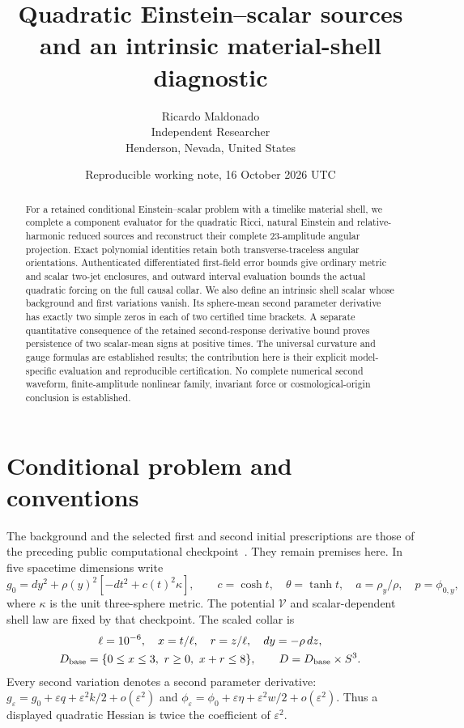 \documentclass[11pt]{article}
\title{Quadratic Einstein--scalar sources and an intrinsic material-shell diagnostic}
\author{Ricardo Maldonado\\Independent Researcher\\Henderson, Nevada, United States}
\date{Reproducible working note, 16 October 2026 UTC}
\newcommand{\eps}{\varepsilon}
\begin{document}
\maketitle
\begin{abstract}
For a retained conditional Einstein--scalar problem with a timelike material
shell, we complete a component evaluator for the quadratic Ricci, natural
Einstein and relative-harmonic reduced sources and reconstruct their complete
23-amplitude angular projection. Exact polynomial identities retain both
transverse-traceless angular orientations. Authenticated differentiated
first-field error bounds give ordinary metric and scalar two-jet enclosures,
and outward interval evaluation bounds the actual quadratic forcing on the
full causal collar. We also define an intrinsic shell scalar whose background
and first variations vanish. Its sphere-mean second parameter derivative has
exactly two simple zeros in each of two certified time brackets. A separate
quantitative consequence of the retained second-response derivative bound
proves persistence of two scalar-mean signs at positive times. The universal
curvature and gauge formulas are established results; the contribution here
is their explicit model-specific evaluation and reproducible certification.
No complete numerical second waveform, finite-amplitude nonlinear family,
invariant force or cosmological-origin conclusion is established.
\end{abstract}

\section{Conditional problem and conventions}

The background and the selected first and second initial prescriptions are
those of the preceding public computational checkpoint~\cite{parent}.
They remain premises here. In five spacetime dimensions write
\begin{equation}
 g_0=dy^2+\rho(y)^2[-dt^2+c(t)^2\kappa],\qquad
 c=\cosh t,\quad \theta=\tanh t,\quad a=\rho_y/\rho,\quad
 p=\phi_{0,y},
\end{equation}
where $\kappa$ is the unit three-sphere metric. The potential $\mathcal V$
and scalar-dependent shell law are fixed by that checkpoint. The scaled
collar is
\begin{equation}
 \begin{gathered}
 \ell=10^{-6},\quad x=t/\ell,\quad r=z/\ell,\quad dy=-\rho\,dz,\\
 D_{\rm base}=\{0\le x\le3,\ r\ge0,\ x+r\le8\},\qquad
 D=D_{\rm base}\times S^3.
 \end{gathered}
 \label{eq:domain}
\end{equation}
Every second variation denotes a second parameter derivative:
$g_\eps=g_0+\eps q+\eps^2 k/2+o(\eps^2)$ and
$\phi_\eps=\phi_0+\eps\eta+\eps^2 w/2+o(\eps^2)$.
Thus a displayed quadratic Hessian is twice the coefficient of $\eps^2$.
\end{document}
